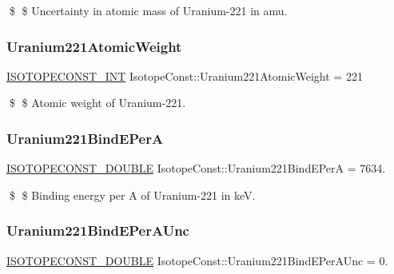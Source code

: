 \$ \$ Uncertainty in atomic mass of Uranium-\/221 in amu. \mbox{\label{group___isotope_const-_uranium-_u221_gae3e8d312c660594c47bd9492574b9ca2}} 
\subsubsection{\texorpdfstring{Uranium221\+Atomic\+Weight}{Uranium221AtomicWeight}}
{\footnotesize\ttfamily \mbox{\hyperlink{group___isotope_const-_macros_ga5f18360b3e99483a35c32d789e62621c}{I\+S\+O\+T\+O\+P\+E\+C\+O\+N\+S\+T\+\_\+\+I\+NT}} Isotope\+Const\+::\+Uranium221\+Atomic\+Weight = 221}

\$ \$ Atomic weight of Uranium-\/221. \mbox{\label{group___isotope_const-_uranium-_u221_ga559a6e7b2884b3c2e4f8e105757aad18}} 
\subsubsection{\texorpdfstring{Uranium221\+Bind\+E\+PerA}{Uranium221BindEPerA}}
{\footnotesize\ttfamily \mbox{\hyperlink{group___isotope_const-_macros_ga8f45a7272ce02c0b4c65c44636ed719a}{I\+S\+O\+T\+O\+P\+E\+C\+O\+N\+S\+T\+\_\+\+D\+O\+U\+B\+LE}} Isotope\+Const\+::\+Uranium221\+Bind\+E\+PerA = 7634.}

\$ \$ Binding energy per A of Uranium-\/221 in keV. \mbox{\label{group___isotope_const-_uranium-_u221_ga7473262629a876a9a8acba2c0463f446}} 
\subsubsection{\texorpdfstring{Uranium221\+Bind\+E\+Per\+A\+Unc}{Uranium221BindEPerAUnc}}
{\footnotesize\ttfamily \mbox{\hyperlink{group___isotope_const-_macros_ga8f45a7272ce02c0b4c65c44636ed719a}{I\+S\+O\+T\+O\+P\+E\+C\+O\+N\+S\+T\+\_\+\+D\+O\+U\+B\+LE}} Isotope\+Const\+::\+Uranium221\+Bind\+E\+Per\+A\+Unc = 0.}

